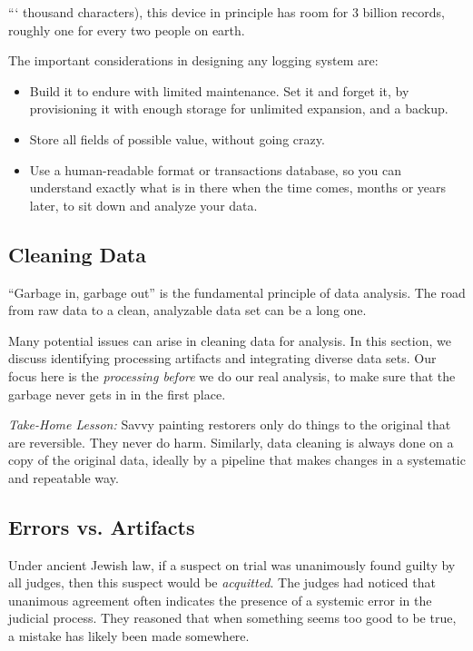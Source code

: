 \documentclass[10pt]{article}
\begin{document}
```
thousand characters), this device in principle has room for 3 billion records, roughly one for every two people on earth.

The important considerations in designing any logging system are:

\begin{itemize}
  \item Build it to endure with limited maintenance. Set it and forget it, by provisioning it with enough storage for unlimited expansion, and a backup.
  \item Store all fields of possible value, without going crazy.
  \item Use a human-readable format or transactions database, so you can understand exactly what is in there when the time comes, months or years later, to sit down and analyze your data.
\end{itemize}

\subsection{Cleaning Data}
``Garbage in, garbage out'' is the fundamental principle of data analysis. The road from raw data to a clean, analyzable data set can be a long one.

Many potential issues can arise in cleaning data for analysis. In this section, we discuss identifying processing artifacts and integrating diverse data sets. Our focus here is the \textit{processing before} we do our real analysis, to make sure that the garbage never gets in in the first place.

\textit{Take-Home Lesson:} Savvy painting restorers only do things to the original that are reversible. They never do harm. Similarly, data cleaning is always done on a copy of the original data, ideally by a pipeline that makes changes in a systematic and repeatable way.

\subsection{Errors vs. Artifacts}
Under ancient Jewish law, if a suspect on trial was unanimously found guilty by all judges, then this suspect would be \textit{acquitted}. The judges had noticed that unanimous agreement often indicates the presence of a systemic error in the judicial process. They reasoned that when something seems too good to be true, a mistake has likely been made somewhere.
\end{document}
